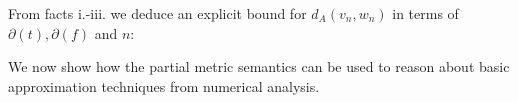 \begin{example}
\begin{itemize}
\end{itemize}

From facts i.-iii. we deduce an explicit bound for $d_{A}(v_{n},w_{n}    )$ in terms of $\partial(t), \partial(f)$ and $n$: \\

\end{example}

We now show how the partial metric semantics can be used to reason about 
basic approximation techniques from numerical analysis.  


